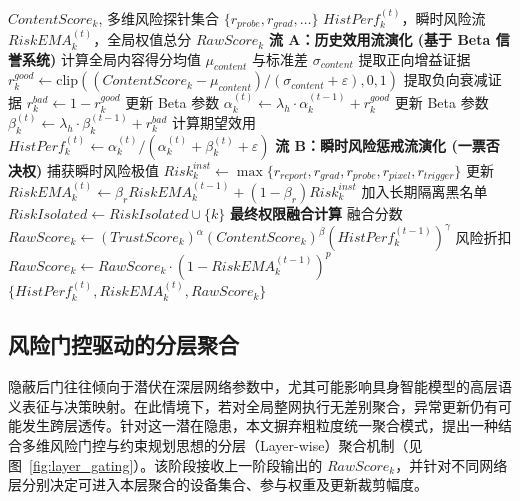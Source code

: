 \documentclass[11pt, a4paper, UTF8, fontset=fandol]{ctexart}
\begin{document}
\begin{algorithm}[htbp]
    \caption{双流正交信任状态演化 (HistPerf \& RiskEMA)}
    \label{alg:phase3}
    \begin{algorithmic}[1]
        \REQUIRE $ContentScore_k$, 多维风险探针集合 $\{r_{probe}, r_{grad}, \dots\}$
        \ENSURE $HistPerf_k^{(t)}$，瞬时风险流 $RiskEMA_k^{(t)}$，全局权值总分 $RawScore_k$
        \STATE \textbf{流 A：历史效用流演化 (基于 Beta 信誉系统)}
        \STATE 计算全局内容得分均值 $\mu_{content}$ 与标准差 $\sigma_{content}$
        \STATE 提取正向增益证据 $r_{k}^{good} \leftarrow \mathrm{clip}((ContentScore_k - \mu_{content}) / (\sigma_{content} + \varepsilon), 0, 1)$
        \STATE 提取负向衰减证据 $r_{k}^{bad} \leftarrow 1 - r_{k}^{good}$
        \STATE 更新 Beta 参数 $\alpha_{k}^{(t)} \leftarrow \lambda_h \cdot \alpha_{k}^{(t-1)} + r_{k}^{good}$
        \STATE 更新 Beta 参数 $\beta_{k}^{(t)} \leftarrow \lambda_h \cdot \beta_{k}^{(t-1)} + r_{k}^{bad}$
        \STATE 计算期望效用 $HistPerf_k^{(t)} \leftarrow \alpha_k^{(t)} / (\alpha_k^{(t)} + \beta_k^{(t)} + \varepsilon)$
        \ENDFOR
        \STATE \textbf{流 B：瞬时风险惩戒流演化 (一票否决权)}
        \STATE 捕获瞬时风险极值 $Risk_k^{inst} \leftarrow \max\{r_{report}, r_{grad}, r_{probe}, r_{pixel}, r_{trigger}\}$
        \STATE 更新 $RiskEMA_k^{(t)} \leftarrow \beta_r RiskEMA_k^{(t-1)} + (1-\beta_r) Risk_k^{inst}$
        \STATE 加入长期隔离黑名单 $RiskIsolated \leftarrow RiskIsolated \cup \{k\}$
        \ENDIF
        \ENDFOR
        \STATE \textbf{最终权限融合计算}
        \STATE 融合分数 $RawScore_k \leftarrow (TrustScore_k)^\alpha (ContentScore_k)^\beta (HistPerf_k^{(t-1)})^\gamma$
        \STATE 风险折扣 $RawScore_k \leftarrow RawScore_k \cdot (1 - RiskEMA_k^{(t-1)})^p$
        \ENDFOR
        \RETURN $\{HistPerf_k^{(t)}, RiskEMA_k^{(t)}, RawScore_k\}$
    \end{algorithmic}
\end{algorithm}


\subsection{风险门控驱动的分层聚合}
隐蔽后门往往倾向于潜伏在深层网络参数中，尤其可能影响具身智能模型的高层语义表征与决策映射。在此情境下，若对全局整网执行无差别聚合，异常更新仍有可能发生跨层透传。针对这一潜在隐患，本文摒弃粗粒度统一聚合模式，提出一种结合多维风险门控与约束规划思想的分层（Layer-wise）聚合机制（见图~\ref{fig:layer_gating}）。该阶段接收上一阶段输出的 $RawScore_k$，并针对不同网络层分别决定可进入本层聚合的设备集合、参与权重及更新裁剪幅度。
\end{document}
